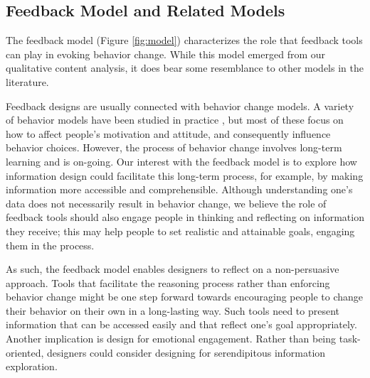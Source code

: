 \documentclass[12pt,oneside]{book}
\begin{document}






\subsection{Feedback Model and Related Models}

The feedback model (Figure \ref{fig:model}) characterizes the role that feedback tools can play in evoking behavior change. While this model emerged from our qualitative content analysis, it does bear some resemblance to other models in the literature.

Feedback designs are usually connected with behavior change models. A variety of behavior models have been studied in practice \cite{abrahamse_review_2005,he_one_2010,consolvo_design_2006}, but most of these focus on how to affect people's motivation and attitude, and consequently influence behavior choices.  However, the process of behavior change involves long-term learning and is on-going. Our interest with the feedback model is to explore how information design could facilitate this long-term process, for example, by making information more accessible and comprehensible. Although understanding one's data does not necessarily result in behavior change, we believe the role of feedback tools should also engage people in thinking and reflecting on information they receive; this may help people to set realistic and attainable goals, engaging them in the process.

As such, the feedback model enables designers to reflect on a non-persuasive approach. Tools that facilitate the reasoning process rather than enforcing behavior change might be one step forward towards encouraging people to change their behavior on their own in a long-lasting way. Such tools need to present information that can be accessed easily and that reflect one's goal appropriately. Another implication is design for emotional engagement. Rather than being task-oriented, designers could consider designing for serendipitous information exploration.
\end{document}
